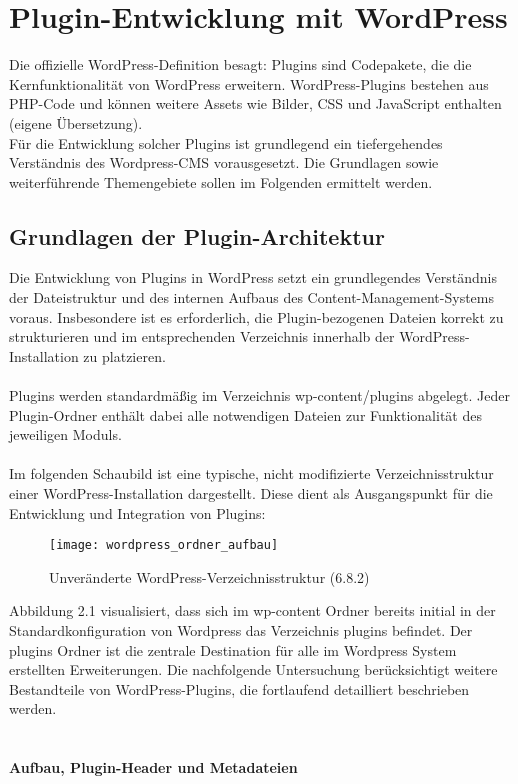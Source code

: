 \section{Plugin-Entwicklung mit WordPress}

Die offizielle WordPress-Definition besagt: \glqq Plugins sind Codepakete, die die Kernfunktionalität von WordPress erweitern.
WordPress-Plugins bestehen aus PHP-Code und können weitere Assets wie Bilder,
CSS und JavaScript enthalten\grqq{} \cite{wordpress2024plugin} (eigene Übersetzung).
\\
Für die Entwicklung solcher Plugins ist grundlegend ein tiefergehendes Verständnis des Wordpress-CMS vorausgesetzt.
Die Grundlagen sowie weiterführende Themengebiete sollen im Folgenden ermittelt werden.



\subsection{Grundlagen der Plugin-Architektur}

Die Entwicklung von Plugins in WordPress setzt ein grundlegendes Verständnis der Dateistruktur und des internen Aufbaus des Content-Management-Systems voraus.
Insbesondere ist es erforderlich, die Plugin-bezogenen Dateien korrekt zu strukturieren und im entsprechenden Verzeichnis innerhalb der WordPress-Installation zu platzieren.\\\\
Plugins werden standardmäßig im Verzeichnis wp-content/plugins abgelegt.
Jeder Plugin-Ordner enthält dabei alle notwendigen Dateien zur Funktionalität des jeweiligen Moduls.\\\\
Im folgenden Schaubild ist eine typische, nicht modifizierte Verzeichnisstruktur einer WordPress-Installation dargestellt.
Diese dient als Ausgangspunkt für die Entwicklung und Integration von Plugins:

\begin{figure}[tbh]
 \centering
 \texttt{[image: wordpress\_ordner\_aufbau]}
 \caption{Unveränderte WordPress-Verzeichnisstruktur (6.8.2)}
 \label{fig:wordpress-verzeichnis}
\end{figure}
\newpage
Abbildung 2.1 visualisiert, dass sich im wp-content Ordner bereits initial in der Standardkonfiguration von Wordpress das Verzeichnis plugins befindet.
Der plugins Ordner ist die zentrale Destination für alle im Wordpress System erstellten Erweiterungen.
Die nachfolgende Untersuchung berücksichtigt weitere Bestandteile von WordPress-Plugins, die fortlaufend detailliert beschrieben werden.
\\\\\\
\textbf{Aufbau, Plugin-Header und Metadateien}

